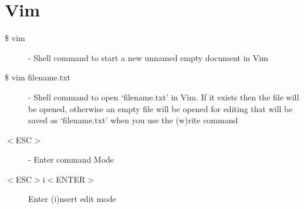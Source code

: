 \documentclass[12pt, a4paper, oneside]{book}
\begin{document}
{\section{Vim}
\label{cribsheet_vim}
\begin{description}
\item[\$ vim] - Shell command to start a new unnamed empty document in Vim
\item[\$ vim filename.txt] - Shell command to open `filename.txt' in Vim. If it exists then the file will be opened, otherwise an empty file will be opened for editing that will be saved as `filename.txt' when you use the (w)rite command
\item[$<$ESC$>$] - Enter command Mode
\item[$<$ESC$>$i$<$ENTER$>$] Enter (i)nsert edit mode
\end{description}
}
\end{document}
